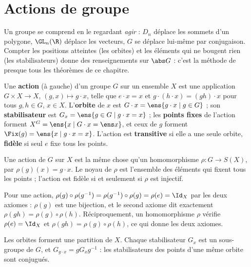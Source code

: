 \section{Actions de groupe}
\begin{intuition}
Un groupe se comprend en le regardant \emph{agir} : $D_n$ déplace les sommets d'un polygone, $\GL_n(\R)$ déplace les vecteurs, $G$ se déplace lui-même par conjugaison. Compter les positions atteintes (les orbites) et les éléments qui ne bougent rien (les stabilisateurs) donne des renseignements sur $\abs G$ : c'est la méthode de presque tous les théorèmes de ce chapitre.
\end{intuition}
\begin{definition}[Action]
Une \textbf{action} (à gauche) d'un groupe $G$ sur un ensemble $X$ est une application $G\times X\to X$, $(g,x)\mapsto g\cdot x$, telle que $e\cdot x=x$ et $g\cdot(h\cdot x)=(gh)\cdot x$ pour tous $g,h\in G$, $x\in X$. L'\textbf{orbite} de $x$ est $G\cdot x=\ens{g\cdot x\mid g\in G}$ ; son \textbf{stabilisateur} est $G_x=\ens{g\in G\mid g\cdot x=x}$ ; les \textbf{points fixes} de l'action forment $X^G=\ens{x\mid G\cdot x=\ens x}$, et ceux de $g$ forment $\Fix(g)=\ens{x\mid g\cdot x=x}$. L'action est \textbf{transitive} si elle a une seule orbite, \textbf{fidèle} si seul $e$ fixe tous les points.
\end{definition}
\begin{proposition}\label{prop-action-hom}
Une action de $G$ sur $X$ est la même chose qu'un homomorphisme $\rho:G\to S(X)$, par $\rho(g)(x)=g\cdot x$. Le noyau de $\rho$ est l'ensemble des éléments qui fixent tous les points ; l'action est fidèle si et seulement si $\rho$ est injectif.
\end{proposition}
\begin{preuve}
Pour une action, $\rho(g)\circ\rho(g^{-1})=\rho(g^{-1})\circ\rho(g)=\rho(e)=\Id_X$ par les deux axiomes : $\rho(g)$ est une bijection, et le second axiome dit exactement $\rho(gh)=\rho(g)\circ\rho(h)$. Réciproquement, un homomorphisme $\rho$ vérifie $\rho(e)=\Id_X$ et $\rho(gh)=\rho(g)\circ\rho(h)$, ce qui donne les deux axiomes.
\end{preuve}
\begin{proposition}\label{prop-orbites}
Les orbites forment une partition de $X$. Chaque stabilisateur $G_x$ est un sous-groupe de $G$, et $G_{g\cdot x}=gG_xg^{-1}$ : les stabilisateurs des points d'une même orbite sont conjugués.
\end{proposition}
